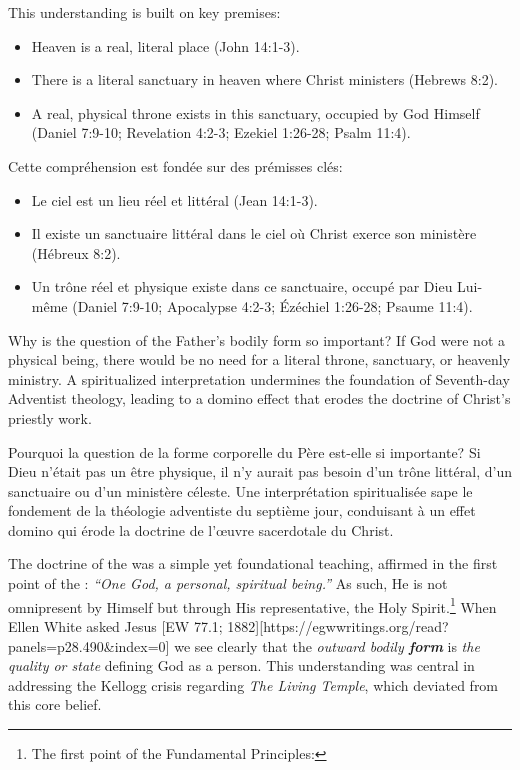 This understanding is built on key premises:
\begin{itemize}
    \item Heaven is a real, literal place (John 14:1-3).
    \item There is a literal sanctuary in heaven where Christ ministers (Hebrews 8:2). 
    \item A real, physical throne exists in this sanctuary, occupied by God Himself (Daniel 7:9-10; Revelation 4:2-3; Ezekiel 1:26-28; Psalm 11:4).
\end{itemize}


Cette compréhension est fondée sur des prémisses clés:
\begin{itemize}
    \item Le ciel est un lieu réel et littéral (Jean 14:1-3).
    \item Il existe un sanctuaire littéral dans le ciel où Christ exerce son ministère (Hébreux 8:2). 
    \item Un trône réel et physique existe dans ce sanctuaire, occupé par Dieu Lui-même (Daniel 7:9-10; Apocalypse 4:2-3; Ézéchiel 1:26-28; Psaume 11:4).
\end{itemize}


Why is the question of the Father’s bodily form so important? If God were not a physical being, there would be no need for a literal throne, sanctuary, or heavenly ministry. A spiritualized interpretation undermines the foundation of Seventh-day Adventist theology, leading to a domino effect that erodes the doctrine of Christ’s priestly work.


Pourquoi la question de la forme corporelle du Père est-elle si importante? Si Dieu n'était pas un être physique, il n'y aurait pas besoin d'un trône littéral, d'un sanctuaire ou d'un ministère céleste. Une interprétation spiritualisée sape le fondement de la théologie adventiste du septième jour, conduisant à un effet domino qui érode la doctrine de l'œuvre sacerdotale du Christ.


The doctrine of the  was a simple yet foundational teaching, affirmed in the first point of the : \textit{“One God, a personal, spiritual being.”} As such, He is not omnipresent by Himself but through His representative, the Holy Spirit.\footnote{The first point of the Fundamental Principles: } When Ellen White asked Jesus [EW 77.1; 1882][https://egwwritings.org/read?panels=p28.490&index=0] we see clearly that the \textit{outward bodily \textbf{form}} is \textit{the quality or state} defining God as a person. This understanding was central in addressing the Kellogg crisis regarding \textit{The Living Temple}, which deviated from this core belief.


